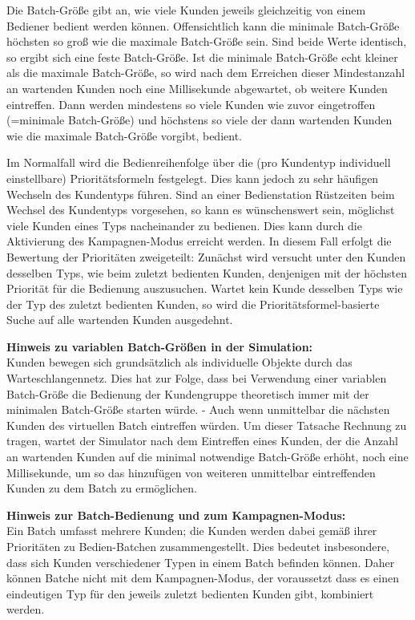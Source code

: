 Die Batch-Größe gibt an, wie viele Kunden jeweils gleichzeitig von einem Bediener bedient werden können. Offensichtlich kann die
minimale Batch-Größe höchsten so groß wie die maximale Batch-Größe sein. Sind beide Werte identisch, so ergibt sich eine feste
Batch-Größe. Ist die minimale Batch-Größe echt kleiner als die maximale Batch-Größe, so wird nach dem Erreichen dieser Mindestanzahl
an wartenden Kunden noch eine Millisekunde abgewartet, ob weitere Kunden eintreffen. Dann werden mindestens so viele Kunden wie zuvor
eingetroffen (=minimale Batch-Größe) und höchstens so viele der dann wartenden Kunden wie die maximale Batch-Größe vorgibt, bedient. 

Im Normalfall wird die Bedienreihenfolge über die (pro Kundentyp individuell einstellbare) Prioritätsformeln festgelegt. Dies kann
jedoch zu sehr häufigen Wechseln des Kundentyps führen. Sind an einer Bedienstation Rüstzeiten beim Wechsel des Kundentyps vorgesehen,
so kann es wünschenswert sein, möglichst viele Kunden eines Typs nacheinander zu bedienen. Dies kann durch die Aktivierung des
Kampagnen-Modus erreicht werden. In diesem Fall erfolgt die Bewertung der Prioritäten zweigeteilt: Zunächst wird versucht unter den
Kunden desselben Typs, wie beim zuletzt bedienten Kunden, denjenigen mit der höchsten Priorität für die Bedienung auszusuchen.
Wartet kein Kunde desselben Typs wie der Typ des zuletzt bedienten Kunden, so wird die Prioritätsformel-basierte Suche auf alle
wartenden Kunden ausgedehnt.

\textbf{Hinweis zu variablen Batch-Größen in der Simulation:}~\\
Kunden bewegen sich grundsätzlich als individuelle Objekte durch das Warteschlangennetz. Dies hat zur Folge, dass bei Verwendung
einer variablen Batch-Größe die Bedienung der Kundengruppe theoretisch immer mit der minimalen Batch-Größe starten würde. - Auch
wenn unmittelbar die nächsten Kunden des virtuellen Batch eintreffen würden. Um dieser Tatsache Rechnung zu tragen, wartet der
Simulator nach dem Eintreffen eines Kunden, der die Anzahl an wartenden Kunden auf die minimal notwendige Batch-Größe erhöht,
noch eine Millisekunde, um so das hinzufügen von weiteren unmittelbar eintreffenden Kunden zu dem Batch zu ermöglichen.

\textbf{Hinweis zur Batch-Bedienung und zum Kampagnen-Modus:}~\\
Ein Batch umfasst mehrere Kunden; die Kunden werden dabei gemäß ihrer Prioritäten zu Bedien-Batchen zusammengestellt.
Dies bedeutet insbesondere, dass sich Kunden verschiedener Typen in einem Batch befinden können. Daher können Batche
nicht mit dem Kampagnen-Modus, der voraussetzt dass es einen eindeutigen Typ für den jeweils zuletzt bedienten
Kunden gibt, kombiniert werden. 

